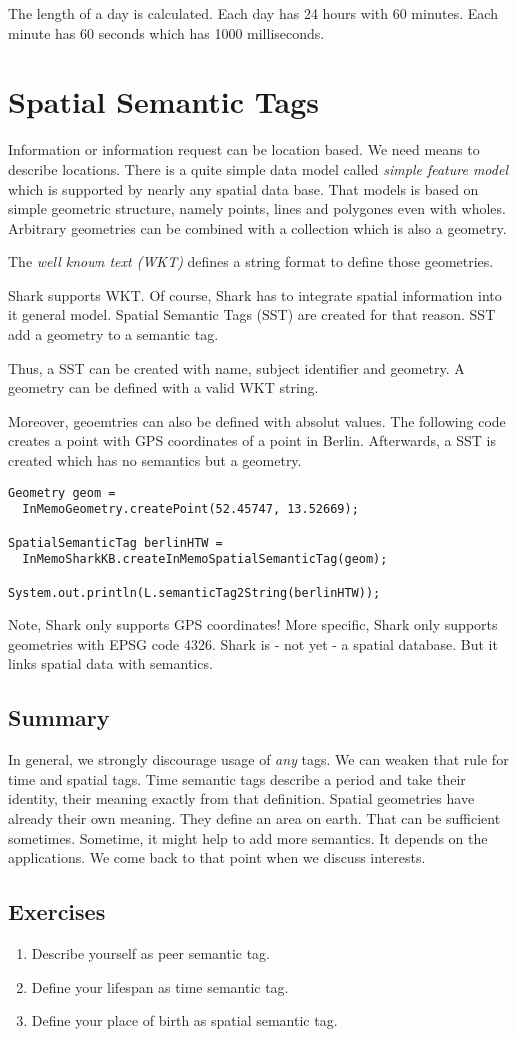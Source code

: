 The length of a day is calculated. Each day has 24 hours with 60 minutes. Each minute has 60 seconds which has 1000 milliseconds.

\section{Spatial Semantic Tags}
Information or information request can be location based. We need means to
describe locations. There is a quite simple data model called {\it simple feature model} which is supported by nearly any spatial data base. That
models is based on simple geometric structure, namely points, lines and polygones even with wholes. Arbitrary geometries can be combined with a collection which is also a geometry.

The {\it well known text (WKT)} defines a string format to define those geometries.

Shark supports WKT. Of course, Shark has to integrate spatial information into it general model. Spatial Semantic Tags (SST) are created for that reason. 
SST add a geometry to a semantic tag.

Thus, a SST can be created with name, subject identifier and geometry.
A geometry can be defined with a valid WKT string.

Moreover, geoemtries can also be defined with absolut values.
The following code creates a point with GPS coordinates of a point in Berlin.
Afterwards, a SST is created which has no semantics but a geometry.

\begin{verbatim}
Geometry geom = 
  InMemoGeometry.createPoint(52.45747, 13.52669);

SpatialSemanticTag berlinHTW = 
  InMemoSharkKB.createInMemoSpatialSemanticTag(geom);

System.out.println(L.semanticTag2String(berlinHTW));
\end{verbatim}

Note, Shark only supports GPS coordinates! More specific, Shark only supports geometries with EPSG code 4326. Shark is - not yet - a spatial database. But it links spatial data with semantics.

\subsection{Summary}
In general, we strongly discourage usage of {\it any} tags. We can weaken that rule for time and spatial tags. Time semantic tags describe a period and 
take their identity, their meaning exactly from that definition. 
Spatial geometries have already their own meaning. They define an area on earth. That can be sufficient sometimes. Sometime, it might help to add more semantics. It depends on the applications. We come back to that point when we discuss interests.

\subsection{Exercises}
\begin{enumerate}
\item 
Describe yourself as peer semantic tag.
\item 
Define your lifespan as time semantic tag.
\item 
Define your place of birth as spatial semantic tag.
\end{enumerate}
